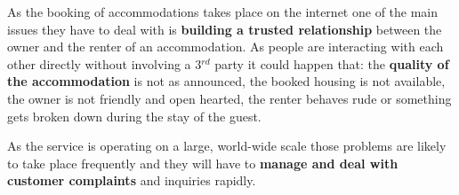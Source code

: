 As the booking of accommodations takes place on the internet one of the main issues they have to deal with is {\bf building a trusted relationship} between the owner and the renter of an accommodation. As people are interacting with each other directly without involving a 3$^{rd}$ party it could happen that: the {\bf quality of the accommodation} is not as announced, the booked housing is not available, the owner is not friendly and open hearted, the renter behaves rude or something gets broken down during the stay of the guest.
\vspace{0.2cm}

As the service is operating on a large, world-wide scale those problems are likely to take place frequently and they will have to {\bf manage and deal with customer complaints} and inquiries rapidly.
